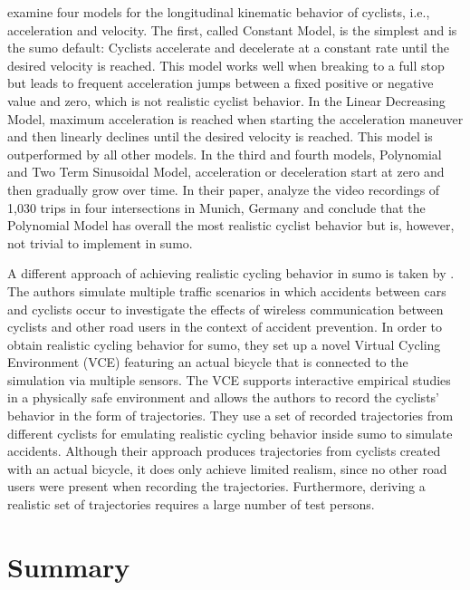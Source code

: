 \textcite{twaddle2016modeling} examine four models for the longitudinal kinematic behavior of cyclists, i.e., acceleration and velocity.
The first, called Constant Model, is the simplest and is the \ac{sumo} default:
Cyclists accelerate and decelerate at a constant rate until the desired velocity is reached.
This model works well when breaking to a full stop but leads to frequent acceleration jumps between a fixed positive or negative value and zero, which is not realistic cyclist behavior.
In the Linear Decreasing Model, maximum acceleration is reached when starting the acceleration maneuver and then linearly declines until the desired velocity is reached.
This model is outperformed by all other models.
In the third and fourth models, Polynomial and Two Term Sinusoidal Model, acceleration or deceleration start at zero and then gradually grow over time.
In their paper, \textcite{twaddle2016modeling} analyze the video recordings of 1,030 trips in four intersections in Munich, Germany and conclude that the Polynomial Model has overall the most realistic cyclist behavior but is, however, not trivial to implement in \ac{sumo}.

A different approach of achieving realistic cycling behavior in \ac{sumo} is taken by \textcite{heinovski2019modeling}.
The authors simulate multiple traffic scenarios in which accidents between cars and cyclists occur to investigate the effects of wireless communication between cyclists and other road users in the context of accident prevention.
In order to obtain realistic cycling behavior for \ac{sumo}, they set up a novel Virtual Cycling Environment (VCE) featuring an actual bicycle that is connected to the simulation via multiple sensors.
The VCE supports interactive empirical studies in a physically safe environment and allows the authors to record the cyclists' behavior in the form of trajectories.
They use a set of recorded trajectories from different cyclists for emulating realistic cycling behavior inside \ac{sumo} to simulate accidents.
Although their approach produces trajectories from cyclists created with an actual bicycle, it does only achieve limited realism, since no other road users were present when recording the trajectories.
Furthermore, deriving a realistic set of trajectories requires a large number of test persons.


\section{Summary}
\label{sec:summary_sumo}


